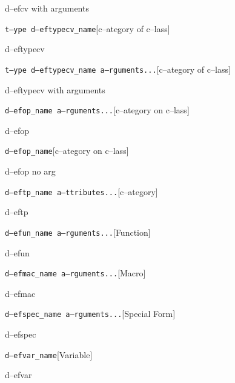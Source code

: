 \documentclass{book}
\begin{document}
\begin{titlepage}
%
d--efcv with arguments

\noindent\texttt\bgroup{}t--ype d--eftypecv\_name\egroup{}\hfill[c--ategory of c--lass]



%
d--eftypecv

\noindent\texttt\bgroup{}t--ype d--eftypecv\_name a--rguments...\egroup{}\hfill[c--ategory of c--lass]



%
d--eftypecv with arguments

\noindent\texttt\bgroup{}d--efop\_name a--rguments...\egroup{}\hfill[c--ategory on c--lass]



%
d--efop

\noindent\texttt\bgroup{}d--efop\_name\egroup{}\hfill[c--ategory on c--lass]



%
d--efop no arg

\noindent\texttt\bgroup{}d--eftp\_name a--ttributes...\egroup{}\hfill[c--ategory]



%
d--eftp

\noindent\texttt\bgroup{}d--efun\_name a--rguments...\egroup{}\hfill[Function]



%
d--efun

\noindent\texttt\bgroup{}d--efmac\_name a--rguments...\egroup{}\hfill[Macro]



%
d--efmac

\noindent\texttt\bgroup{}d--efspec\_name a--rguments...\egroup{}\hfill[Special Form]



%
d--efspec

\noindent\texttt\bgroup{}d--efvar\_name\egroup{}\hfill[Variable]



%
d--efvar


\end{titlepage}
\end{document}
